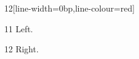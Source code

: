 \documentclass[paper=A4]{ropas-poster}
\begin{document}
\begin{postergrid}{1}{2}[line-width=0bp,line-colour=red]
\begin{posterblock}{1}{1}
Left.
\end{posterblock}
\begin{posterblock}{1}{2}
Right.
\end{posterblock}
\end{postergrid}
\end{document}
